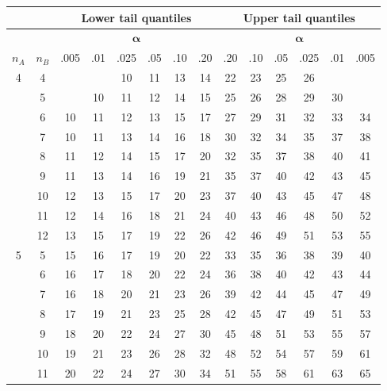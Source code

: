 
\begin{center}
  
  \begin{tabular}[t]{|c|c|*{6}{c}|*{6}{c}|}
  \multicolumn{2}{c}{}
  &
  \multicolumn{6}{c}{\textbf{Lower tail quantiles}}
  &
  \multicolumn{6}{c}{\textbf{Upper tail quantiles}}
  \\
  \hline
  &
  &
  \multicolumn{6}{|c}{$\mathbf{\alpha}$}
  &
  \multicolumn{6}{|c|}{$\mathbf{\alpha}$} \\
  $n_A$ & $n_B$ 
          &.005 &.01  &.025 & .05 & .10 & .20 & .20 & .10 & .05 &.025 & .01 &.005 \\
  \hline
   4 &  4 &     &     &  10 &  11 &  13 &  14 &  22 &  23 &  25 &  26 &     &     \\
     &  5 &     &  10 &  11 &  12 &  14 &  15 &  25 &  26 &  28 &  29 &  30 &     \\
     &  6 &  10 &  11 &  12 &  13 &  15 &  17 &  27 &  29 &  31 &  32 &  33 &  34 \\
     &  7 &  10 &  11 &  13 &  14 &  16 &  18 &  30 &  32 &  34 &  35 &  37 &  38 \\
     &  8 &  11 &  12 &  14 &  15 &  17 &  20 &  32 &  35 &  37 &  38 &  40 &  41 \\
     &  9 &  11 &  13 &  14 &  16 &  19 &  21 &  35 &  37 &  40 &  42 &  43 &  45 \\
     & 10 &  12 &  13 &  15 &  17 &  20 &  23 &  37 &  40 &  43 &  45 &  47 &  48 \\
     & 11 &  12 &  14 &  16 &  18 &  21 &  24 &  40 &  43 &  46 &  48 &  50 &  52 \\
     & 12 &  13 &  15 &  17 &  19 &  22 &  26 &  42 &  46 &  49 &  51 &  53 &  55 \\
  \hline
   5 &  5 &  15 &  16 &  17 &  19 &  20 &  22 &  33 &  35 &  36 &  38 &  39 &  40 \\  %
     &  6 &  16 &  17 &  18 &  20 &  22 &  24 &  36 &  38 &  40 &  42 &  43 &  44 \\
     &  7 &  16 &  18 &  20 &  21 &  23 &  26 &  39 &  42 &  44 &  45 &  47 &  49 \\
     &  8 &  17 &  19 &  21 &  23 &  25 &  28 &  42 &  45 &  47 &  49 &  51 &  53 \\
     &  9 &  18 &  20 &  22 &  24 &  27 &  30 &  45 &  48 &  51 &  53 &  55 &  57 \\
     & 10 &  19 &  21 &  23 &  26 &  28 &  32 &  48 &  52 &  54 &  57 &  59 &  61 \\
     & 11 &  20 &  22 &  24 &  27 &  30 &  34 &  51 &  55 &  58 &  61 &  63 &  65 \\

\end{tabular}
\end{center}
